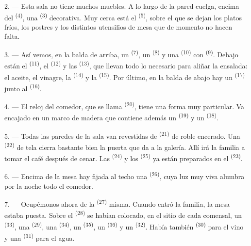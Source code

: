 2. --- Esta sala no tiene muchos muebles. A lo largo de la pared cuelga,
encima del  \textsuperscript{(4)}, una 
\textsuperscript{(3)} decorativa. Muy cerca está el  \textsuperscript{(5)},
sobre el que se dejan los platos fríos, los postres y los distintos
utensilios de mesa que de momento no hacen falta.

3. --- Así vemos, en la balda de arriba, un 
\textsuperscript{(7)}, un  \textsuperscript{(8)} y una 
\textsuperscript{(10)} con  \textsuperscript{(9)}. Debajo están el
 \textsuperscript{(11)}, el  \textsuperscript{(12)} y las
 \textsuperscript{(13)}, que llevan todo lo necesario para aliñar
la ensalada: el aceite, el vinagre, la  \textsuperscript{(14)} y la
 \textsuperscript{(15)}. Por último, en la balda de abajo hay un
 \textsuperscript{(17)} junto al  \textsuperscript{(16)}.

4. --- El reloj del comedor, que se llama 
\textsuperscript{(20)}, tiene una forma muy particular. Va encajado en un marco de
madera que contiene además un  \textsuperscript{(19)} y un
 \textsuperscript{(18)}.

\VUsaut{4.6mm}
\VUsaut{3.0mm}

5. --- Todas las paredes de la sala van revestidas de  \textsuperscript{(21)} de roble encerado. Una  \textsuperscript{(22)}
de tela cierra bastante bien la puerta que da a la galería. Allí irá la
familia a tomar el café después de cenar. Las  \textsuperscript{(24)} y
los  \textsuperscript{(25)} ya están preparados en el
 \textsuperscript{(23)}.

6. --- Encima de la mesa hay fijada al techo una 
\textsuperscript{(26)}, cuya luz muy viva alumbra por la noche todo el comedor.

7. --- Ocupémonos ahora de la  \textsuperscript{(27)} misma.
Cuando entró la familia, la mesa estaba puesta. Sobre el 
\textsuperscript{(28)} se habían colocado, en el sitio de cada comensal, un
 \textsuperscript{(33)}, una  \textsuperscript{(29)}, una
 \textsuperscript{(34)}, un  \textsuperscript{(35)}, un
 \textsuperscript{(36)} y un  \textsuperscript{(32)}. Había
también  \textsuperscript{(30)} para el vino y una 
\textsuperscript{(31)} para el agua.

